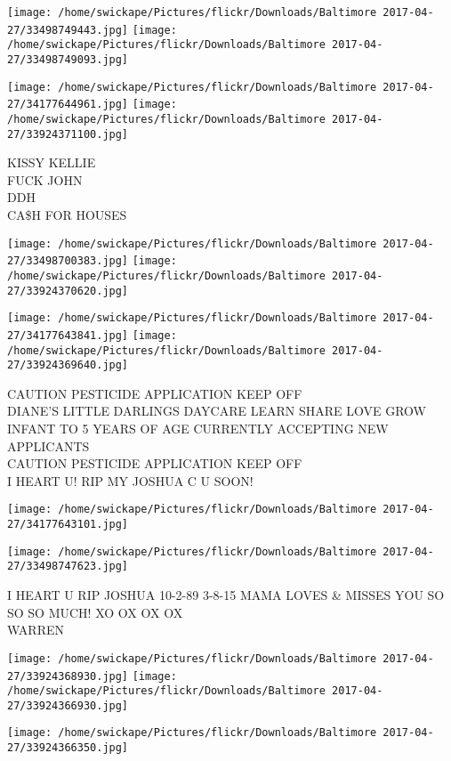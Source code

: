 \documentclass[10pt,letterpaper]{article}
\begin{document}
\texttt{[image: /home/swickape/Pictures/flickr/Downloads/Baltimore 2017-04-27/33498749443.jpg]}
\texttt{[image: /home/swickape/Pictures/flickr/Downloads/Baltimore 2017-04-27/33498749093.jpg]}

\texttt{[image: /home/swickape/Pictures/flickr/Downloads/Baltimore 2017-04-27/34177644961.jpg]}
\texttt{[image: /home/swickape/Pictures/flickr/Downloads/Baltimore 2017-04-27/33924371100.jpg]}

KISSY KELLIE\\
FUCK JOHN\\
DDH\\
CA\$H FOR HOUSES
\pagebreak

\texttt{[image: /home/swickape/Pictures/flickr/Downloads/Baltimore 2017-04-27/33498700383.jpg]}
\texttt{[image: /home/swickape/Pictures/flickr/Downloads/Baltimore 2017-04-27/33924370620.jpg]}

\texttt{[image: /home/swickape/Pictures/flickr/Downloads/Baltimore 2017-04-27/34177643841.jpg]}
\texttt{[image: /home/swickape/Pictures/flickr/Downloads/Baltimore 2017-04-27/33924369640.jpg]}

CAUTION PESTICIDE APPLICATION KEEP OFF\\
DIANE'S LITTLE DARLINGS DAYCARE LEARN SHARE LOVE GROW INFANT TO 5 YEARS OF AGE CURRENTLY ACCEPTING NEW APPLICANTS\\
CAUTION PESTICIDE APPLICATION KEEP OFF\\
I HEART U!  RIP MY JOSHUA C U SOON!
\pagebreak

\texttt{[image: /home/swickape/Pictures/flickr/Downloads/Baltimore 2017-04-27/34177643101.jpg]}

\vspace{0.25in}
\texttt{[image: /home/swickape/Pictures/flickr/Downloads/Baltimore 2017-04-27/33498747623.jpg]}

I HEART U RIP JOSHUA 10{-}2{-}89 3{-}8{-}15 MAMA LOVES \& MISSES YOU SO SO SO MUCH! XO OX OX OX\\
WARREN
\pagebreak

\texttt{[image: /home/swickape/Pictures/flickr/Downloads/Baltimore 2017-04-27/33924368930.jpg]}
\texttt{[image: /home/swickape/Pictures/flickr/Downloads/Baltimore 2017-04-27/33924366930.jpg]}

\texttt{[image: /home/swickape/Pictures/flickr/Downloads/Baltimore 2017-04-27/33924366350.jpg]}
\end{document}

